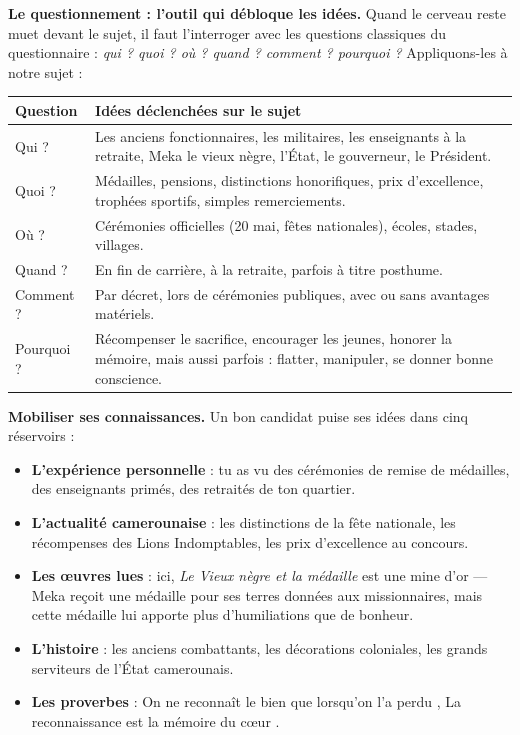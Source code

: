 \documentclass[11pt]{article}
\begin{document}
\textbf{Le questionnement : l'outil qui débloque les idées.} Quand le cerveau reste muet devant le sujet, il faut l'interroger avec les questions classiques du questionnaire : \emph{qui ? quoi ? où ? quand ? comment ? pourquoi ?} Appliquons-les à notre sujet :

\begin{center}
\begin{tabularx}{\linewidth}{|l|X|}\hline
\rowcolor{popblueL}\textbf{Question} & \textbf{Idées déclenchées sur le sujet} \\ \hline
Qui ? & Les anciens fonctionnaires, les militaires, les enseignants à la retraite, Meka le vieux nègre, l'État, le gouverneur, le Président. \\ \hline
Quoi ? & Médailles, pensions, distinctions honorifiques, prix d'excellence, trophées sportifs, simples remerciements. \\ \hline
Où ? & Cérémonies officielles (20 mai, fêtes nationales), écoles, stades, villages. \\ \hline
Quand ? & En fin de carrière, à la retraite, parfois à titre posthume. \\ \hline
Comment ? & Par décret, lors de cérémonies publiques, avec ou sans avantages matériels. \\ \hline
Pourquoi ? & Récompenser le sacrifice, encourager les jeunes, honorer la mémoire, mais aussi parfois : flatter, manipuler, se donner bonne conscience. \\ \hline
\end{tabularx}
\end{center}

\textbf{Mobiliser ses connaissances.} Un bon candidat puise ses idées dans cinq réservoirs :
\begin{itemize}
\item \textbf{L'expérience personnelle} : tu as vu des cérémonies de remise de médailles, des enseignants primés, des retraités de ton quartier.
\item \textbf{L'actualité camerounaise} : les distinctions de la fête nationale, les récompenses des Lions Indomptables, les prix d'excellence au concours.
\item \textbf{Les œuvres lues} : ici, \emph{Le Vieux nègre et la médaille} est une mine d'or — Meka reçoit une médaille pour ses terres données aux missionnaires, mais cette médaille lui apporte plus d'humiliations que de bonheur.
\item \textbf{L'histoire} : les anciens combattants, les décorations coloniales, les grands serviteurs de l'État camerounais.
\item \textbf{Les proverbes} : \og On ne reconnaît le bien que lorsqu'on l'a perdu \fg, \og La reconnaissance est la mémoire du cœur \fg.
\end{itemize}
\end{document}
